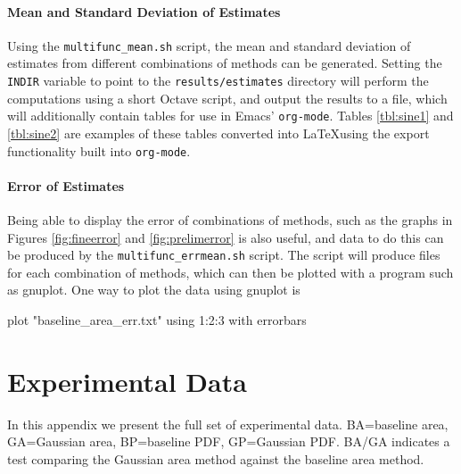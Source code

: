 \documentclass[a4paper,11pt]{article}
\begin{document}
\begin{appendices}
\paragraph{Mean and Standard Deviation of Estimates} Using the \texttt{multifunc\_mean.sh} script, the mean
and standard deviation of estimates from different combinations of methods can
be generated. Setting the \texttt{INDIR} variable to point to the
\texttt{results/estimates} directory will perform the computations using a short
Octave script, and output the results to a file, which will additionally contain
tables for use in Emacs' \texttt{org-mode}. Tables \ref{tbl:sine1} and
\ref{tbl:sine2} are examples of these tables converted into \LaTeX using the
export functionality built into \texttt{org-mode}.

\paragraph{Error of Estimates}
Being able to display the error of combinations of methods, such as the graphs
in Figures \ref{fig:fineerror} and \ref{fig:prelimerror} is also useful, and
data to do this can be produced by the \texttt{multifunc\_errmean.sh}
script. The script will produce files for each combination of methods, which can
then be plotted with a program such as gnuplot. One way to plot the data using
gnuplot is
\small
\begin{verbatimtab}
plot "baseline_area_err.txt" using 1:2:3 with errorbars
\end{verbatimtab}
\normalsize
\section{Experimental Data}
\label{sec-11}

In this appendix we present the full set of experimental data. BA=baseline area,
GA=Gaussian area, BP=baseline PDF, GP=Gaussian PDF. BA/GA indicates a test
comparing the Gaussian area method against the baseline area method.

\begin{table}[htb]


\end{table}
\end{appendices}
\end{document}
